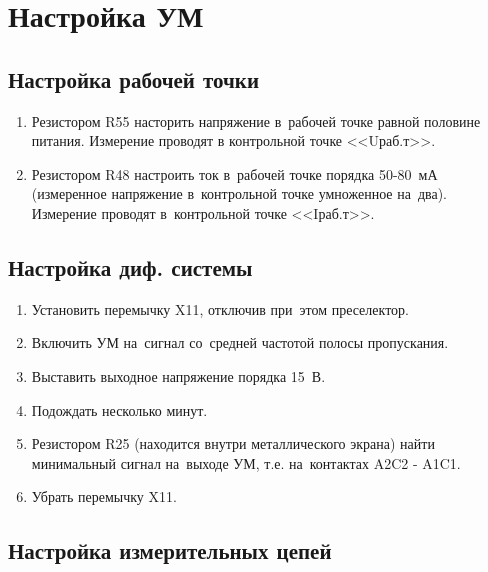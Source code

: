 \section{Настройка УМ}

\subsection{Настройка рабочей точки}

\begin{enumerate}
	\item Резистором R55 насторить напряжение в~рабочей точке равной половине питания. Измерение проводят в контрольной точке <<Uраб.т>>.
	\item Резистором R48 настроить ток в~рабочей точке порядка 50-80~мА (измеренное напряжение в~контрольной точке умноженное на~два). Измерение проводят в~контрольной точке <<Iраб.т>>.	
\end{enumerate}

\subsection{Настройка диф. системы}

\begin{enumerate}
	\item Установить перемычку X11, отключив при~этом преселектор.
	\item Включить УМ на~сигнал со~средней частотой полосы пропускания.
	\item Выставить выходное напряжение порядка 15~В.
	\item Подождать несколько минут.
	\item Резистором R25 (находится внутри металлического экрана) найти минимальный сигнал на~выходе УМ, т.е. на~контактах A2C2 - A1C1.
	\item Убрать перемычку X11.
\end{enumerate}

\subsection{Настройка измерительных цепей}

